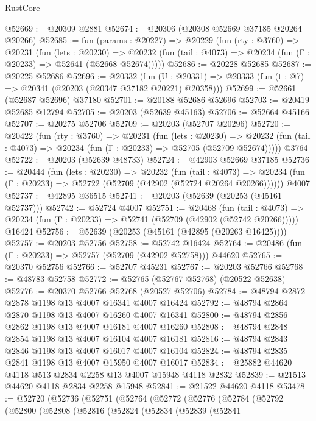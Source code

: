 \begin{lexlean}{RustCore}
\begin{coremodule}
@52669 := @20309 @2881
@52674 := @20306 (@20308 @52669 @37185 @20264 @20266)
@52685 := fun (params : @20227) =>
  @20229
    (fun (rty : @3760) =>
    @20231
      (fun (lets : @20230) =>
      @20232 (fun (tail : @4073) => @20234 (fun (Γ : @20233) => @52641 (@52668 @52674)))))
@52686 := @20228 @52685
@52687 := @20225 @52686
@52696 := @20332
    (fun (U : @20331) => @20333 (fun (t : @7) => @20341 (@20203 (@20347 @37182 @20221) @20358)))
@52699 := @52661 (@52687 @52696) @37180
@52701 := @20188 @52686 @52696
@52703 := @20419 @52685 @12794
@52705 := @20203 (@52639 @45163)
@52706 := @52664 @45166
@52707 := @20275 @52706
@52709 := @20203 (@52707 @20296)
@52720 := @20422
    (fun (rty : @3760) =>
    @20231
      (fun (lets : @20230) =>
      @20232 (fun (tail : @4073) => @20234 (fun (Γ : @20233) => @52705 (@52709 @52674)))))
    @3764
@52722 := @20203 (@52639 @48733)
@52724 := @42903 @52669 @37185
@52736 := @20444
    (fun (lets : @20230) =>
    @20232
      (fun (tail : @4073) =>
      @20234 (fun (Γ : @20233) => @52722 (@52709 (@42902 (@52724 @20264 @20266))))))
    @4007
@52737 := @42895 @36515
@52741 := @20203 (@52639 (@20253 (@45161 @52737)))
@52742 := @52724 @4007
@52751 := @20468
    (fun (tail : @4073) => @20234 (fun (Γ : @20233) => @52741 (@52709 (@42902 (@52742 @20266)))))
    @16424
@52756 := @52639 (@20253 (@45161 (@42895 (@20263 @16425))))
@52757 := @20203 @52756
@52758 := @52742 @16424
@52764 := @20486 (fun (Γ : @20233) => @52757 (@52709 (@42902 @52758))) @44620
@52765 := @20370 @52756
@52766 := @52707 @45231
@52767 := @20203 @52766
@52768 := @48783 @52758
@52772 := @52765 (@52767 @52768) (@20522 @52638)
@52776 := @20370 @52766 @52768 (@20527 @52706)
@52784 := @48794 @2872 @2878 @1198 @13 @4007 @16341 @4007 @16424
@52792 := @48794 @2864 @2870 @1198 @13 @4007 @16260 @4007 @16341
@52800 := @48794 @2856 @2862 @1198 @13 @4007 @16181 @4007 @16260
@52808 := @48794 @2848 @2854 @1198 @13 @4007 @16104 @4007 @16181
@52816 := @48794 @2843 @2846 @1198 @13 @4007 @16017 @4007 @16104
@52824 := @48794 @2835 @2841 @1198 @13 @4007 @15950 @4007 @16017
@52834 := @25882 @44620 @4118 @513 @2834 @2258 @13 @4007 @15948 @4118 @2832
@52839 := @21513 @44620 @4118 @2834 @2258 @15948
@52841 := @21522 @44620 @4118
@53478 := @52720
    (@52736
      (@52751
        (@52764
          (@52772
            (@52776
              (@52784
                (@52792
                  (@52800
                    (@52808
                      (@52816
                        (@52824
                          (@52834
                            (@52839
                              (@52841

\end{coremodule}
\end{lexlean}
